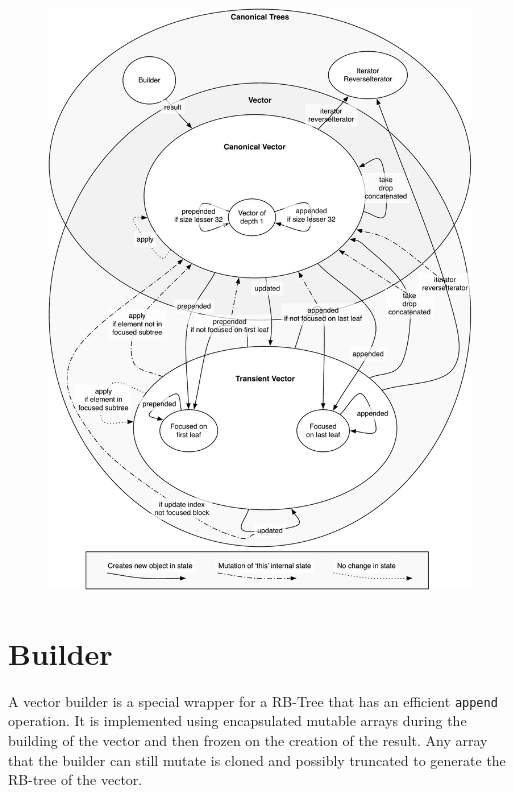 \begin{figure}[h!]
  \centering
  \includegraphics[width=\textwidth]{Figures/StatesGraph}
  \caption{}
  \label{StatesGraph}
\end{figure}

\clearpage
\section{Builder}
A vector builder is a special wrapper for a RB-Tree that has an efficient \texttt{append} operation. It is implemented using encapsulated mutable arrays during the building of the vector and then frozen on the creation of the result. Any array that the builder can still mutate is cloned and possibly truncated to generate the RB-tree of the vector. 

